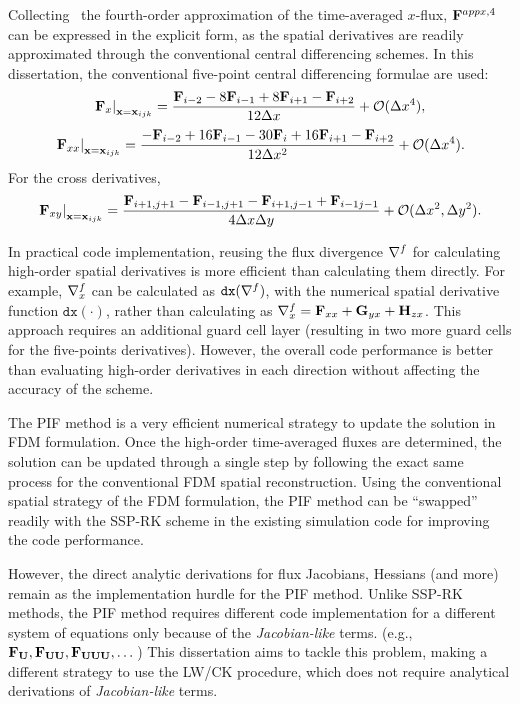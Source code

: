 Collecting~ the fourth-order approximation of the time-averaged \( x \)-flux,
\( \mathbf{F}^{appx, 4} \) can be expressed in the explicit form, as the spatial derivatives
are readily approximated through the conventional central differencing schemes.
In this dissertation, the conventional five-point central differencing formulae are used:
\begin{equation}\label{eq:pif_central_dfdx}
    \left. \mathbf{F}_{x} \right|_{\mathbf{x} = \mathbf{x}_{ijk}} = \frac{\mathbf{F}_{i-2} - 8 \mathbf{F}_{i-1} + 8 \mathbf{F}_{i+1} - \mathbf{F}_{i+2} }{12\Delta x} + \mathcal{O}(\Delta x^{4}),
\end{equation}
\begin{equation}\label{eq:pif_central_dfdxx}
    \left. \mathbf{F}_{xx} \right|_{\mathbf{x} = \mathbf{x}_{ijk}} = \frac{-\mathbf{F}_{i-2} + 16 \mathbf{F}_{i-1} - 30 \mathbf{F}_{i} + 16 \mathbf{F}_{i+1} - \mathbf{F}_{i+2} }{12\Delta x^{2}} + \mathcal{O}(\Delta x^{4}).
\end{equation}
For the cross derivatives,
\begin{equation}\label{eq:pif_central_dfdxy}
    \left. \mathbf{F}_{xy} \right |_{\mathbf{x} = \mathbf{x}_{ijk}} =
    \frac{\mathbf{F}_{i+1, j+1} - \mathbf{F}_{i-1, j+1} - \mathbf{F}_{i+1, j-1} + \mathbf{F}_{i-1 j-1}}{4\Delta x\Delta y} + \mathcal{O}(\Delta x^{2}, \Delta y^{2}).
\end{equation}

In practical code implementation, reusing the flux divergence \( \nabla^{f} \)
for calculating high-order spatial derivatives is more efficient than calculating them directly.
For example, \( \nabla^{f}_{x} \) can be calculated as \( \texttt{dx}(\nabla^{f}) \),
with the numerical spatial derivative function \( \texttt{dx}(\cdot) \),
rather than calculating as \( \nabla^{f}_{x} = \mathbf{F}_{xx} + \mathbf{G}_{yx}+ \mathbf{H}_{zx} \).
This approach requires an additional guard cell layer
(resulting in two more guard cells for the five-points derivatives).
However, the overall code performance is better than
evaluating high-order derivatives in each direction without affecting the accuracy of the scheme.

The PIF method is a very efficient numerical strategy to update the solution in FDM formulation.
Once the high-order time-averaged fluxes are determined, the solution can be updated
through a single step by following the exact same process for the conventional FDM spatial reconstruction.
Using the conventional spatial strategy of the FDM formulation,
the PIF method can be ``swapped'' readily with the SSP-RK scheme
in the existing simulation code for improving the code performance.

However, the direct analytic derivations for flux Jacobians, Hessians (and more)
remain as the implementation hurdle for the PIF method.
Unlike SSP-RK methods, the PIF method requires different code implementation
for a different system of equations only because of the \textit{Jacobian-like} terms. (e.g., \( \mathbf{F}_{\mathbf{U}}, \mathbf{F}_{\mathbf{U}\mathbf{U}}, \mathbf{F}_{\mathbf{U}\mathbf{U}\mathbf{U}}, \dots \))
This dissertation aims to tackle this problem,
making a different strategy to use the LW/CK procedure,
which does not require analytical derivations of \textit{Jacobian-like} terms.



